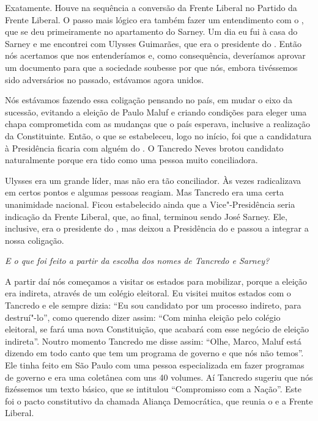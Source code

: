 Exatamente. Houve na sequência a conversão da Frente
Liberal no Partido da Frente Liberal. O passo mais lógico era também
fazer um entendimento com o , que se deu primeiramente no
apartamento do Sarney. Um dia eu fui à casa do Sarney e me encontrei com
Ulysses Guimarães, que era o presidente do . Então nós acertamos que
nos entenderíamos e, como consequência, deveríamos aprovar um documento
para que a sociedade soubesse por que nós, embora tivéssemos sido
adversários no passado, estávamos agora unidos.

Nós estávamos fazendo essa coligação pensando no país, em mudar o eixo
da sucessão, evitando a eleição de Paulo Maluf e criando condições para
eleger uma chapa comprometida com as mudanças que o país esperava,
inclusive a realização da Constituinte. Então, o que se estabeleceu,
logo no início, foi que a candidatura à Presidência ficaria com alguém
do . O Tancredo Neves brotou candidato naturalmente porque era tido
como uma pessoa muito conciliadora.

Ulysses era um grande líder, mas não era tão conciliador. Às vezes
radicalizava em certos pontos e algumas pessoas reagiam. Mas Tancredo
era uma certa unanimidade nacional. Ficou estabelecido ainda que a
Vice"-Presidência seria indicação da Frente Liberal, que, ao final,
terminou sendo José Sarney. Ele, inclusive, era o presidente do , mas
deixou a Presidência do  e passou a integrar a nossa coligação.

\medskip

\noindent\emph{E o que foi feito a partir da escolha dos nomes de Tancredo e
Sarney? }

A partir daí nós começamos a visitar os estados para
mobilizar, porque a eleição era indireta, através de um colégio
eleitoral. Eu visitei muitos estados com o Tancredo e ele sempre dizia:
``Eu sou candidato por um processo indireto, para destruí"-lo'', como
querendo dizer assim: ``Com minha eleição pelo colégio eleitoral, se fará
uma nova Constituição, que acabará com esse negócio de eleição
indireta''. Noutro momento Tancredo me disse assim: ``Olhe, Marco, Maluf
está dizendo em todo canto que tem um programa de governo e que nós não
temos''. Ele tinha feito em São Paulo com uma pessoa especializada em
fazer programas de governo e era uma coletânea com uns 40 volumes. Aí
Tancredo sugeriu que nós fizéssemos um texto básico, que se intitulou
``Compromisso com a Nação''. Este foi o pacto constitutivo da chamada
Aliança Democrática, que reunia o  e a Frente Liberal.

